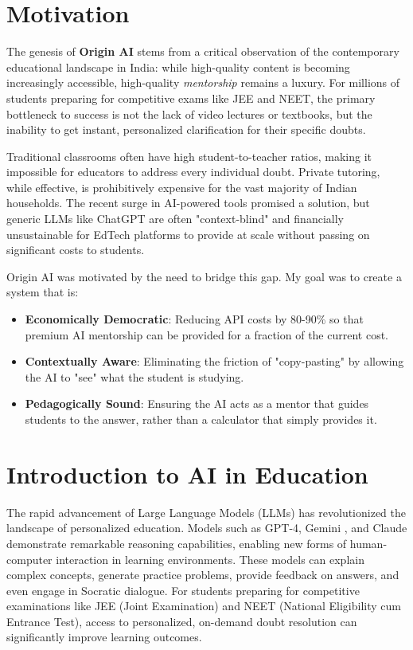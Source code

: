 \section{Motivation}

The genesis of \textbf{Origin AI} stems from a critical observation of the contemporary educational landscape in India: while high-quality content is becoming increasingly accessible, high-quality \textit{mentorship} remains a luxury. For millions of students preparing for competitive exams like JEE and NEET, the primary bottleneck to success is not the lack of video lectures or textbooks, but the inability to get instant, personalized clarification for their specific doubts.

Traditional classrooms often have high student-to-teacher ratios, making it impossible for educators to address every individual doubt. Private tutoring, while effective, is prohibitively expensive for the vast majority of Indian households. The recent surge in AI-powered tools promised a solution, but generic LLMs like ChatGPT are often "context-blind" and financially unsustainable for EdTech platforms to provide at scale without passing on significant costs to students.

Origin AI was motivated by the need to bridge this gap. My goal was to create a system that is:
\begin{itemize}
    \item \textbf{Economically Democratic}: Reducing API costs by 80-90\% so that premium AI mentorship can be provided for a fraction of the current cost.
    \item \textbf{Contextually Aware}: Eliminating the friction of "copy-pasting" by allowing the AI to "see" what the student is studying.
    \item \textbf{Pedagogically Sound}: Ensuring the AI acts as a mentor that guides students to the answer, rather than a calculator that simply provides it.
\end{itemize}

\section{Introduction to AI in Education}

The rapid advancement of Large Language Models (LLMs) has revolutionized the landscape of personalized education. Models such as GPT-4, Gemini \cite{google2024gemini}, and Claude demonstrate remarkable reasoning capabilities, enabling new forms of human-computer interaction in learning environments. These models can explain complex concepts, generate practice problems, provide feedback on answers, and even engage in Socratic dialogue. For students preparing for competitive examinations like JEE (Joint Examination) and NEET (National Eligibility cum Entrance Test), access to personalized, on-demand doubt resolution can significantly improve learning outcomes.

